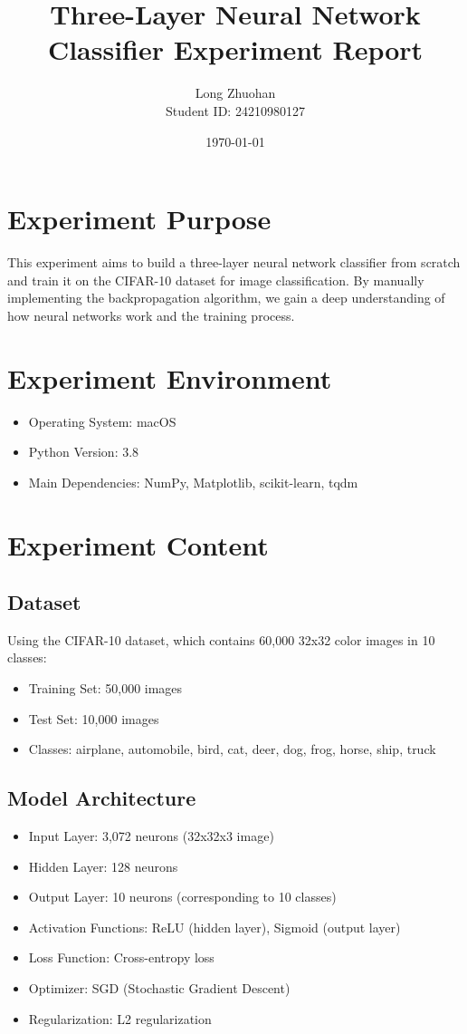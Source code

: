 \documentclass[12pt]{article}
\title{Three-Layer Neural Network Classifier Experiment Report}
\author{Long Zhuohan \\ Student ID: 24210980127}
\date{\today}
\begin{document}
\maketitle

\section{Experiment Purpose}
This experiment aims to build a three-layer neural network classifier from scratch and train it on the CIFAR-10 dataset for image classification. By manually implementing the backpropagation algorithm, we gain a deep understanding of how neural networks work and the training process.

\section{Experiment Environment}
\begin{itemize}
    \item Operating System: macOS
    \item Python Version: 3.8
    \item Main Dependencies: NumPy, Matplotlib, scikit-learn, tqdm
\end{itemize}

\section{Experiment Content}

\subsection{Dataset}
Using the CIFAR-10 dataset, which contains 60,000 32x32 color images in 10 classes:
\begin{itemize}
    \item Training Set: 50,000 images
    \item Test Set: 10,000 images
    \item Classes: airplane, automobile, bird, cat, deer, dog, frog, horse, ship, truck
\end{itemize}

\subsection{Model Architecture}
\begin{itemize}
    \item Input Layer: 3,072 neurons (32x32x3 image)
    \item Hidden Layer: 128 neurons
    \item Output Layer: 10 neurons (corresponding to 10 classes)
    \item Activation Functions: ReLU (hidden layer), Sigmoid (output layer)
    \item Loss Function: Cross-entropy loss
    \item Optimizer: SGD (Stochastic Gradient Descent)
    \item Regularization: L2 regularization
\end{itemize}
\end{document}
